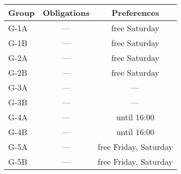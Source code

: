 \begin{tabular}{lcc}
  Group & Obligations & Preferences \\\hline\hline
  G-1A  & ---         & free Saturday \\
  G-1B  & ---         & free Saturday \\\hline
  G-2A  & ---         & free Saturday \\
  G-2B  & ---         & free Saturday \\\hline
  G-3A  & ---         & ---         \\
  G-3B  & ---         & ---         \\\hline
  G-4A  & ---         & until 16:00 \\
  G-4B  & ---         & until 16:00 \\\hline
  G-5A  & ---         & free Friday, Saturday \\
  G-5B  & ---         & free Friday, Saturday \\\hline
\end{tabular}
